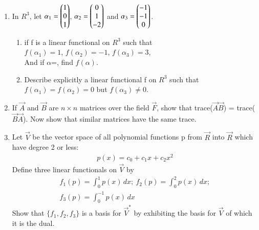 \renewcommand{\theequation}{\theenumi}
\renewcommand{\thefigure}{\theenumi}
\begin{enumerate}[label=\thesubsection.\arabic*.,ref=\thesubsection.\theenumi]


\item In $R^3$, let $\alpha_1 = \begin{pmatrix}1\\0\\1\end{pmatrix}$, $\alpha_2 =\begin{pmatrix}0\\1\\-2\end{pmatrix}$ and 
$\alpha_3 =\begin{pmatrix}-1\\-1\\0\end{pmatrix}$. 

\begin{enumerate}
\item if f is a linear functional on $R^3$ such that\\ $f(\alpha_1)=1$, $f(\alpha_2)=-1$,  $f(\alpha_3)=3$,\\ And if $\alpha$=, find $f(\alpha)$.
%
\\
\solution

\item Describe explicitly a linear functional f on $R^3$ such that $f(\alpha_1)=f(\alpha_2)=0$ but $f(\alpha_3)\neq 0$.
\\
\solution

\end{enumerate}
%
\item If $\vec{A}$ and $\vec{B}$ are $n\times n$ matrices over the field $\vec{F}$, show that trace($\vec{A}\vec{B}$) = trace($\vec{B}\vec{A}$). Now show that similar matrices have the same trace. 
%
\\
\solution

\item Let $\vec{V}$ be the vector space of all polynomial functions p from $\vec{R}$ into $\vec{R}$ which have degree 2 or less:
\begin{align}
    p(x) = c_0 + c_1x + c_2x^2 \nonumber
\end{align}
Define three linear functionals on $\vec{V}$ by
\begin{align}
    f_1(p) = \int_{0}^{1} p(x) \, dx; \: f_2(p) = \int_{0}^{2} p(x) \, dx; \nonumber \\
    f_3(p) = \int_{0}^{-1} p(x) \, dx \nonumber
\end{align}
Show that $\{f_1, f_2,f_3\}$ is a basis for $\vec{V}^*$ by exhibiting the basis for $\vec{V}$ of which it is the dual. 

\end{enumerate}
